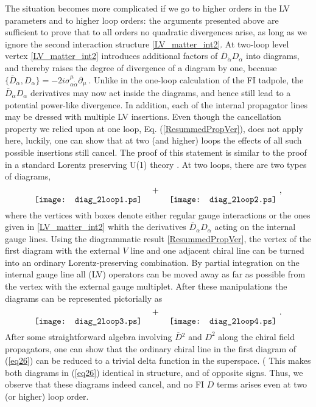 \documentclass[12pt]{revtex4}
\begin{document}
The situation becomes more complicated if we go to higher orders in 
the LV parameters and to higher loop orders: the arguments 
presented above are sufficient to
prove that to all orders no quadratic divergences arise, as long as we
ignore the second interaction structure \eqref{LV_matter_int2}. At two-loop 
level vertex \eqref{LV_matter_int2} introduces additional factors of $\overline{D}_{\dot\alpha}
D_\alpha$ into diagrams, and thereby raises 
the degree of divergence of a diagram by one, because 
\(
\{\overline{D}_{\dot\alpha}, D_\alpha\} = 
-2 i \sigma_{\alpha\dot\alpha}^\mu \partial_\mu~.
\) 
Unlike in the one-loop calculation of the FI tadpole, the
$\overline{D}_{\dot\alpha} D_\alpha$ derivatives may now act inside
the diagrams, and hence still lead to a potential power-like divergence. In addition, 
each of the internal propagator lines may be dressed with multiple LV
insertions. Even though the cancellation property we relied upon at one loop, Eq. (\ref{ResummedPropVer}), does 
not apply here,  luckily, one can show that at two (and higher) loops the effects of all such
possible insertions still cancel. The proof of this statement is similar to
the proof in a standard Lorentz preserving U(1) theory
\cite{Fischler:1981zk}. At two loops, there are two types of diagrams,
\begin{equation}
\raisebox{-2.5ex}{\texttt{[image: diag\_2loop1.ps]}}
\quad + \quad 
\raisebox{-2.5ex}{\texttt{[image: diag\_2loop2.ps]}}
~,
\end{equation} 
where the vertices with boxes denote either regular gauge interactions or
the ones given in \eqref{LV_matter_int2} whith the derivatives
$\overline{D}_{\dot\alpha} D_\alpha$ acting on the internal gauge lines. 
Using the diagrammatic result \eqref{ResummedPropVer}, the vertex of 
the first diagram with the external $V$ line and one adjacent chiral
line can be turned into an ordinary Lorentz-preserving combination. 
By partial integration on
the internal gauge line all (LV) operators can be moved away as far as
possible from the vertex with the external gauge multiplet. After
these manipulations the diagrams can be represented pictorially as  
\begin{equation}
\raisebox{-2.5ex}{\texttt{[image: diag\_2loop3.ps]}}
\quad + \quad 
\raisebox{-2.5ex}{\texttt{[image: diag\_2loop4.ps]}}
~.
\label{eq26}
\end{equation} 
After some straightforward algebra involving $\overline{D}{}^2$ and 
$D^2$ along the chiral field propagators, one can show that 
the ordinary chiral line in the first diagram of (\ref{eq26}) 
can be reduced to a trivial delta
function in the superspace.
(%
This makes both diagrams in (\ref{eq26}) identical in structure, and of opposite signs. 
Thus, we observe that these diagrams indeed cancel, and no FI $D$ terms arises even 
at two (or higher) loop order.  
\end{document}
